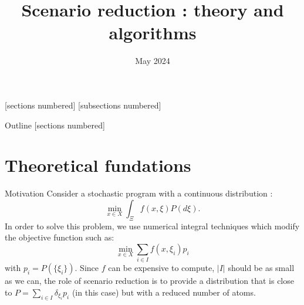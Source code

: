 \documentclass{beamer}
\title{Scenario reduction : theory and algorithms}
\date{May 2024}
\theoremstyle{plain}
\begin{document}
[sections numbered]
[subsections numbered]


\begin{frame}[plain]
 \maketitle
\end{frame}

\begin{frame}[noframenumbering]{Outline}
 [sections numbered]
 \tableofcontents[hideallsubsections]
\end{frame}

\section{Theoretical fundations}

\begin{frame}{Motivation}
 Consider a stochastic program with a continuous distribution :
$$
\min_{x\in X}\int_\Xi f\left(x,\xi\right)P\left(d\xi\right).
$$
In order to solve this problem, we use numerical integral techniques which modify the objective function such as:
$$
\min_{x\in X}\sum_{i\in I}f\left(x,\xi_i\right)p_i
$$
with $p_i=P\left(\{\xi_i\}\right)$. Since $f$ can be expensive to compute, $\lvert I\rvert$ should be as small as we can, the role of scenario reduction is to provide a distribution that is close to $P=\sum_{i\in I}\delta_{\xi_i}p_i$ (in this case) but with a reduced number of atoms.

 
\end{frame}
\end{document}
